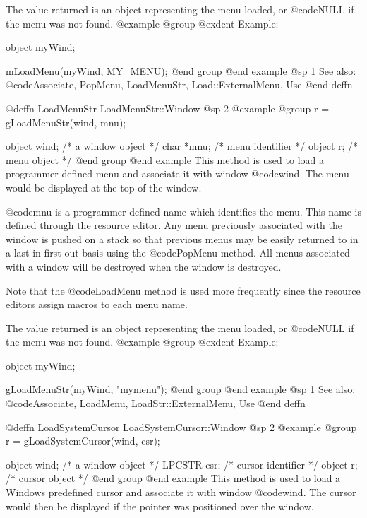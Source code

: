The value returned is an object representing the menu loaded, or
@code{NULL} if the menu was not found.
@example
@group
@exdent Example:

object  myWind;

mLoadMenu(myWind, MY_MENU);
@end group
@end example
@sp 1
See also:  @code{Associate, PopMenu, LoadMenuStr, Load::ExternalMenu, Use}
@end deffn














@deffn {LoadMenuStr} LoadMenuStr::Window
@sp 2
@example
@group
r = gLoadMenuStr(wind, mnu);

object   wind;  /*  a window object  */
char    *mnu;   /*  menu identifier  */
object   r;     /*  menu object      */
@end group
@end example
This method is used to load a programmer defined menu and associate it
with window @code{wind}.  The menu would be displayed at the top
of the window.

@code{mnu} is a programmer defined name which identifies the menu.  This
name is defined through the resource editor.  Any menu previously associated
with the window is pushed on a stack so that previous menus may be easily
returned to in a last-in-first-out basis using the @code{PopMenu} method.
All menus associated with a window will be destroyed when the window
is destroyed.

Note that the @code{LoadMenu} method is used more frequently since the
resource editors assign macros to each menu name.

The value returned is an object representing the menu loaded, or
@code{NULL} if the menu was not found.
@example
@group
@exdent Example:

object  myWind;

gLoadMenuStr(myWind, "mymenu");
@end group
@end example
@sp 1
See also:  @code{Associate, LoadMenu, LoadStr::ExternalMenu, Use}
@end deffn












@deffn {LoadSystemCursor} LoadSystemCursor::Window
@sp 2
@example
@group
r = gLoadSystemCursor(wind, csr);

object   wind;  /*  a window object    */
LPCSTR   csr;   /*  cursor identifier  */
object   r;     /*  cursor object      */
@end group
@end example
This method is used to load a Windows predefined cursor and associate it
with window @code{wind}.  The cursor would then be displayed if the pointer
was positioned over the window.

